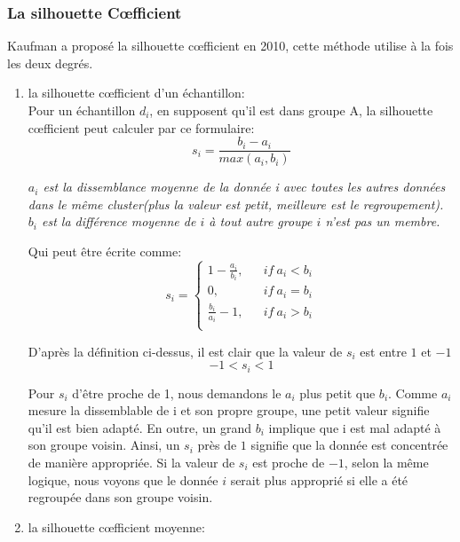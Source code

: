 \subsubsection{La silhouette C\oe fficient}

Kaufman a proposé la silhouette c\oe fficient en 2010, cette méthode utilise à la fois les deux degrés.

\begin{enumerate}
\item la silhouette c\oe fficient d'un échantillon:\\

 Pour un échantillon $d_{i}$, en supposent qu'il est dans groupe A, la silhouette c\oe fficient peut calculer par ce formulaire:
$$s_{i}=\frac{b_{i}-a_{i}}{max(a_{i},b_{i})} $$

\emph{$a_{i}$ est la dissemblance moyenne de la donnée i avec toutes les autres données dans le même cluster(plus la valeur est petit, meilleure est le regroupement). $b_{i}$ est la différence moyenne de $i$ à tout autre groupe $i$ n'est pas un membre.}
\vspace{1ex}

Qui peut être écrite comme:
$$  s_{i}=\left\{
\begin{array}{rcl}
1-\frac{a_{i}}{b_{i}},       &      & if\  a_{i}<b_{i}\\
0,     &      & if\ a_{i}=b_{i}\\
\frac{b_{i}}{a_{i}}-1,     &      & if\ a_{i}>b_{i}\\
\end{array} \right. $$

D'après la définition ci-dessus, il est clair que la valeur de $s_{i}$ est entre $1$ et $-1$
$$-1<s_{i}<1$$

Pour $s_{i}$ d'être proche de 1, nous demandons le $a_{i}$ plus petit que $b_{i}$. Comme $a_{i}$ mesure la dissemblable de i et son propre groupe, une petit valeur signifie qu'il est bien adapté. En outre, un grand $b_{i}$ implique que i est mal adapté à son groupe voisin. Ainsi, un $s_{i}$ près de $1$ signifie que la donnée est concentrée de manière appropriée. Si la valeur de $s_{i}$ est proche de $-1$, selon la même logique, nous voyons que le donnée $i$ serait plus approprié si elle a été regroupée dans son groupe voisin.

\item la silhouette c\oe fficient moyenne:


\end{enumerate}
